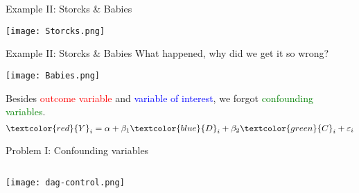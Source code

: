 \documentclass[aspectratio=169]{beamer}
\begin{document}
	\begin{frame}{Example II:  Storcks \& Babies }
		\begin{center}
		\texttt{[image: Storcks.png]}
		\end{center}
	\end{frame}


	\begin{frame}{Example II:  Storcks \& Babies }
		What happened, why did we get it so wrong?
		\begin{center}
		\texttt{[image: Babies.png]}
		\end{center}
		\footnotesize{Besides \textcolor{red}{outcome variable} and \textcolor{blue}{variable of interest}, we forgot \textcolor{green}{confounding variables}.}
		\begin{equation}
			\textcolor{red}{Y}_i = \alpha + \beta_1 \textcolor{blue}{D}_i + \beta_2 \textcolor{green}{C}_i + \varepsilon_i
		\end{equation}
	\end{frame}


	\begin{frame}{Problem I: Confounding variables}
		\begin{columns}
			\begin{column}{0.5\textwidth}
				\begin{center}
				\texttt{[image: dag-control.png]}
				\end{center}
			\end{column}
			\begin{column}{0.5\textwidth}  %
			    \begin{center}
			    \end{center}
			\end{column}
		\end{columns}
	\end{frame}

\end{document}
